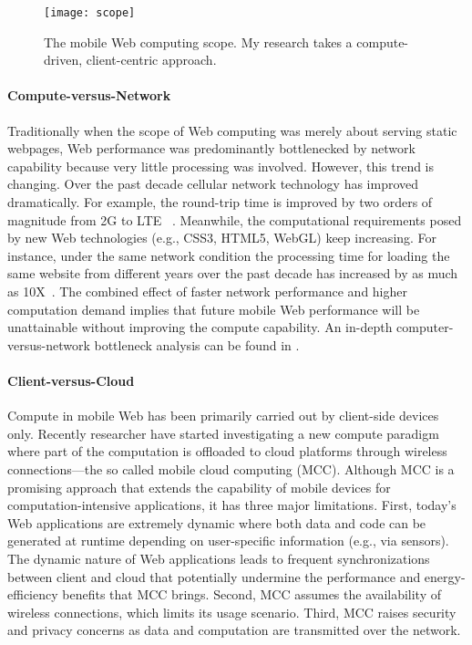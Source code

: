 \begin{figure}[t]
\centering
\texttt{[image: scope]}
\caption{The mobile Web computing scope. My research takes a compute-driven, client-centric approach.}
\label{fig:scope}
\end{figure}

\paragraph{Compute-versus-Network} Traditionally when the scope of Web computing was merely about serving static webpages, Web performance was predominantly bottlenecked by network capability because very little processing was involved. However, this trend is changing. Over the past decade cellular network technology has improved dramatically. For example, the round-trip time is improved by two orders of magnitude from 2G to LTE ~\cite{4gtest}. Meanwhile, the computational requirements posed by new Web technologies (e.g., CSS3, HTML5, WebGL) keep increasing. For instance, under the same network condition the processing time for loading the same website from different years over the past decade has increased by as much as 10X~\cite{big-little}. The combined effect of faster network performance and higher computation demand implies that future mobile Web performance will be unattainable without improving the compute capability. An in-depth computer-versus-network bottleneck analysis can be found in .

\paragraph{Client-versus-Cloud} Compute in mobile Web has been primarily carried out by client-side devices only. Recently researcher have started investigating a new compute paradigm where part of the computation is offloaded to cloud platforms through wireless connections---the so called mobile cloud computing (MCC). Although MCC is a promising approach that extends the capability of mobile devices for computation-intensive applications, it has three major limitations. First, today's Web applications are extremely dynamic where both data and code can be generated at runtime depending on user-specific information (e.g., via sensors). The dynamic nature of Web applications leads to frequent synchronizations between client and cloud that potentially undermine the performance and energy-efficiency benefits that MCC brings. Second, MCC assumes the availability of wireless connections, which limits its usage scenario. Third, MCC raises security and privacy concerns as data and computation are transmitted over the network.

